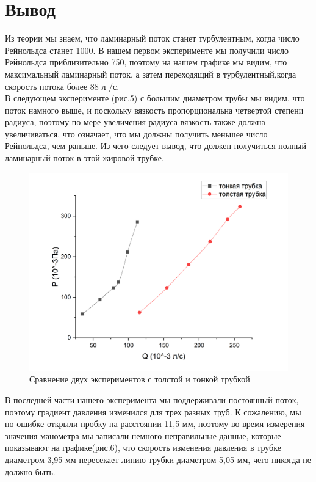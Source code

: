\documentclass[a4paper, 12pt]{article}%
\begin{document}
\section{Вывод}
Из теории мы знаем, что ламинарный поток станет турбулентным, когда число Рейнольдса станет 1000. В нашем первом эксперименте мы получили число Рейнольдса приблизительно 750, поэтому на нашем графике мы видим, что максимальный ламинарный поток, а затем переходящий в турбулентный,когда скорость потока более 88 л /с. \\
\linebreak В следующем эксперименте (рис.5) с большим диаметром трубы мы видим, что поток намного выше, и поскольку вязкость пропорциональна четвертой степени радиуса, поэтому по мере увеличения радиуса вязкость также должна увеличиваться, что означает, что мы должны получить меньшее число Рейнольдса, чем раньше. Из чего следует вывод, что должен получиться полный ламинарный поток в этой жировой трубке.
\begin{figure}[h]
\center
\includegraphics[scale=0.4]{labphoto12.png}
\caption{Сравнение двух экспериментов с толстой и тонкой трубкой}
\end{figure}

\newpage В последней части нашего эксперимента мы поддерживали постоянный поток, поэтому градиент давления изменился для трех разных труб. К сожалению, мы по ошибке открыли пробку на расстоянии 11,5 мм, поэтому во время измерения значения манометра мы записали немного неправильные данные, которые показывают на графике(рис.6), что скорость изменения давления в трубке диаметром 3,95 мм пересекает линию трубки диаметром 5,05 мм, чего никогда не должно быть.
\end{document}

